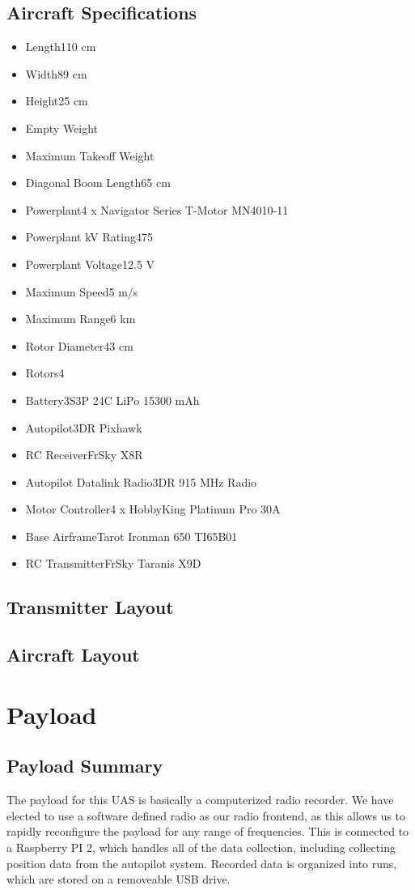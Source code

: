 \documentclass{report}
\begin{document}
		\subsection{Aircraft Specifications}
			\begin{itemize}
				\item Length\hfill110 cm
				\item Width\hfill89 cm
				\item Height\hfill25 cm
				\item Empty Weight\hfill
				\item Maximum Takeoff Weight\hfill
				\item Diagonal Boom Length\hfill65 cm
				\item Powerplant\hfill 4 x Navigator Series T-Motor MN4010-11
				\item Powerplant kV Rating\hfill475
				\item Powerplant Voltage\hfill12.5 V
				\item Maximum Speed\hfill 5 m/s
				\item Maximum Range\hfill 6 km
				\item Rotor Diameter\hfill 43 cm
				\item Rotors\hfill4
				\item Battery\hfill 3S3P 24C LiPo 15300 mAh
				\item Autopilot\hfill3DR Pixhawk
				\item RC Receiver\hfill FrSky X8R
				\item Autopilot Datalink Radio\hfill 3DR 915 MHz Radio
				\item Motor Controller\hfill 4 x HobbyKing Platinum Pro 30A
				\item Base Airframe\hfill Tarot Ironman 650 TI65B01
				\item RC Transmitter\hfill FrSky Taranis X9D
			\end{itemize}
		\subsection{Transmitter Layout}
		\subsection{Aircraft Layout}
	\section{Payload}
		\subsection{Payload Summary}
			The payload for this UAS is basically a computerized radio recorder.  We have elected to use a software defined radio as our radio frontend, as this allows us to rapidly reconfigure the payload for any range of frequencies.  This is connected to a Raspberry PI 2, which handles all of the data collection, including collecting position data from the autopilot system.  Recorded data is organized into runs, which are stored on a removeable USB drive.
\end{document}
